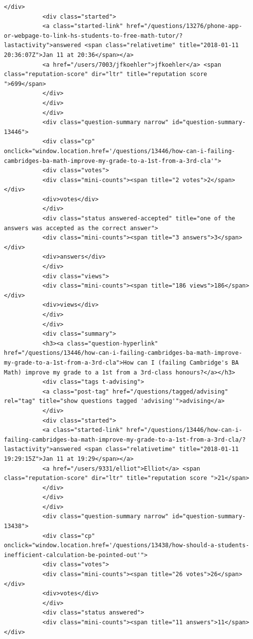 \documentclass[11pt]{article}
\begin{document}
\begin{Verbatim}[commandchars=\\\{\}]
           </div>
           <div class="started">
           <a class="started-link" href="/questions/13276/phone-app-or-webpage-to-link-hs-students-to-free-math-tutor/?lastactivity">answered <span class="relativetime" title="2018-01-11 20:36:07Z">Jan 11 at 20:36</span></a>
           <a href="/users/7003/jfkoehler">jfkoehler</a> <span class="reputation-score" dir="ltr" title="reputation score ">699</span>
           </div>
           </div>
           </div>
           <div class="question-summary narrow" id="question-summary-13446">
           <div class="cp" onclick="window.location.href='/questions/13446/how-can-i-failing-cambridges-ba-math-improve-my-grade-to-a-1st-from-a-3rd-cla'">
           <div class="votes">
           <div class="mini-counts"><span title="2 votes">2</span></div>
           <div>votes</div>
           </div>
           <div class="status answered-accepted" title="one of the answers was accepted as the correct answer">
           <div class="mini-counts"><span title="3 answers">3</span></div>
           <div>answers</div>
           </div>
           <div class="views">
           <div class="mini-counts"><span title="186 views">186</span></div>
           <div>views</div>
           </div>
           </div>
           <div class="summary">
           <h3><a class="question-hyperlink" href="/questions/13446/how-can-i-failing-cambridges-ba-math-improve-my-grade-to-a-1st-from-a-3rd-cla">How can I (failing Cambridge's BA Math) improve my grade to a 1st from a 3rd-class honours?</a></h3>
           <div class="tags t-advising">
           <a class="post-tag" href="/questions/tagged/advising" rel="tag" title="show questions tagged 'advising'">advising</a>
           </div>
           <div class="started">
           <a class="started-link" href="/questions/13446/how-can-i-failing-cambridges-ba-math-improve-my-grade-to-a-1st-from-a-3rd-cla/?lastactivity">answered <span class="relativetime" title="2018-01-11 19:29:15Z">Jan 11 at 19:29</span></a>
           <a href="/users/9331/elliot">Elliot</a> <span class="reputation-score" dir="ltr" title="reputation score ">21</span>
           </div>
           </div>
           </div>
           <div class="question-summary narrow" id="question-summary-13438">
           <div class="cp" onclick="window.location.href='/questions/13438/how-should-a-students-inefficient-calculation-be-pointed-out'">
           <div class="votes">
           <div class="mini-counts"><span title="26 votes">26</span></div>
           <div>votes</div>
           </div>
           <div class="status answered">
           <div class="mini-counts"><span title="11 answers">11</span></div>

\end{Verbatim}
\end{document}
